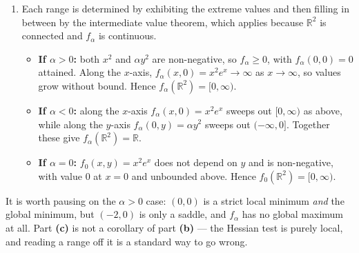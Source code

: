 \begin{exercisesolution}
\begin{enumerate}[label=\textbf{(\alph*)}]
  \item Each range is determined by exhibiting the extreme values and then filling in between by the
    intermediate value theorem, which applies because $\mathbb{R}^2$ is connected and $f_\alpha$ is
    continuous.
\begin{itemize}
  \item \textbf{If $\alpha > 0$:} both $x^2$ and $\alpha y^2$ are non-negative, so $f_\alpha \geq 0$,
    with $f_\alpha(0,0) = 0$ attained. Along the $x$-axis, $f_\alpha(x,0) = x^2 e^x \to \infty$ as
    $x \to \infty$, so values grow without bound. Hence $f_\alpha(\mathbb{R}^2) = [0,\infty)$.
  \item \textbf{If $\alpha < 0$:} along the $x$-axis $f_\alpha(x,0) = x^2 e^x$ sweeps out
    $[0,\infty)$ as above, while along the $y$-axis $f_\alpha(0,y) = \alpha y^2$ sweeps out
    $(-\infty,0]$. Together these give $f_\alpha(\mathbb{R}^2) = \mathbb{R}$.
  \item \textbf{If $\alpha = 0$:} $f_0(x,y) = x^2 e^x$ does not depend on $y$ and is non-negative,
    with value $0$ at $x = 0$ and unbounded above. Hence $f_0(\mathbb{R}^2) = [0,\infty)$.
\end{itemize}
\end{enumerate}
\begin{ainote}
It is worth pausing on the $\alpha > 0$ case: $(0,0)$ is a strict local minimum \emph{and} the global
minimum, but $(-2,0)$ is only a saddle, and $f_\alpha$ has no global maximum at all. Part
\textbf{(c)} is not a corollary of part \textbf{(b)} --- the Hessian test is purely local, and
reading a range off it is a standard way to go wrong.
\end{ainote}
\end{exercisesolution}
